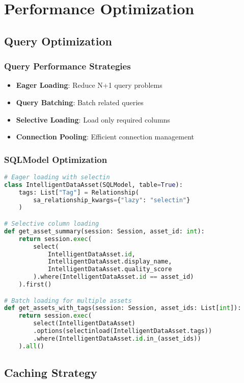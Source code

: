 \section{Performance Optimization}

\subsection{Query Optimization}

\subsubsection{Query Performance Strategies}
\begin{itemize}
    \item \textbf{Eager Loading}: Reduce N+1 query problems
    \item \textbf{Query Batching}: Batch related queries
    \item \textbf{Selective Loading}: Load only required columns
    \item \textbf{Connection Pooling}: Efficient connection management
\end{itemize}

\subsubsection{SQLModel Optimization}
\begin{lstlisting}[language=Python, caption=SQLModel Query Optimization]
# Eager loading with selectin
class IntelligentDataAsset(SQLModel, table=True):
    tags: List["Tag"] = Relationship(
        sa_relationship_kwargs={"lazy": "selectin"}
    )

# Selective column loading
def get_asset_summary(session: Session, asset_id: int):
    return session.exec(
        select(
            IntelligentDataAsset.id,
            IntelligentDataAsset.display_name,
            IntelligentDataAsset.quality_score
        ).where(IntelligentDataAsset.id == asset_id)
    ).first()

# Batch loading for multiple assets
def get_assets_with_tags(session: Session, asset_ids: List[int]):
    return session.exec(
        select(IntelligentDataAsset)
        .options(selectinload(IntelligentDataAsset.tags))
        .where(IntelligentDataAsset.id.in_(asset_ids))
    ).all()
\end{lstlisting}

\subsection{Caching Strategy}

